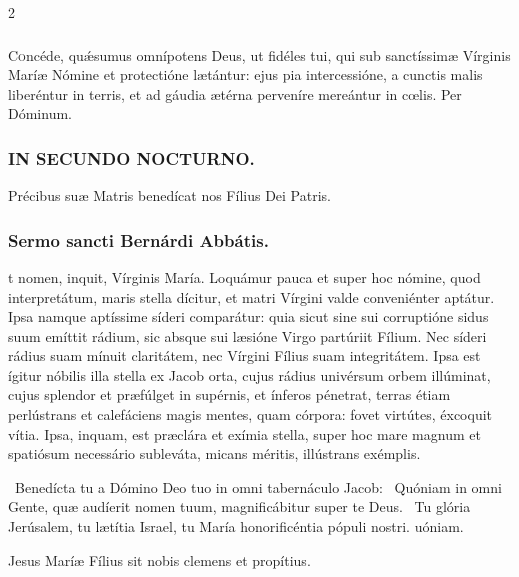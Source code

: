 \documentclass[9pt,twoside]{extarticle}
\begin{document}
\begin{multicols}{2}
\subsubsection*{\center {}}
\lettrine{C}oncéde, quǽsumus omnípotens Deus, ut fidéles tui, qui sub sanctíssimæ Vírginis Maríæ Nómine et protectióne lætántur: ejus pia intercessióne, a cunctis malis liberéntur in terris, et ad gáudia ætérna perveníre mereántur in cœlis. Per Dóminum.

\begin{tightlist}{}
\item {}
\end{tightlist}

\subsubsection*{\center \textsc{IN SECUNDO NOCTURNO.}}
\begin{tightlist}{}
\item {\small {} Précibus suæ Matris benedícat nos Fílius Dei Patris.}
\end{tightlist}
\subsubsection*{\center Sermo sancti Bernárdi Abbátis.}
\begin{center}\end{center}
t nomen, inquit, Vírginis María. Loquámur pauca et super hoc nómine, quod interpretátum, maris stella dícitur, et matri Vírgini valde conveniénter aptátur. Ipsa namque aptíssime síderi comparátur: quia sicut sine sui corruptióne sidus suum emíttit rádium, sic absque sui læsióne Virgo partúriit Fílium. Nec síderi rádius suam mínuit claritátem, nec Vírgini Fílius suam integritátem. Ipsa est ígitur nóbilis illa stella ex Jacob orta, cujus rádius univérsum orbem illúminat, cujus splendor et præfúlget in supérnis, et ínferos pénetrat, terras étiam perlústrans et calefáciens magis mentes, quam córpora: fovet virtútes, éxcoquit vítia. Ipsa, inquam, est præclára et exímia stella, super hoc mare magnum et spatiósum necessário subleváta, micans méritis, illústrans exémplis.

\begin{tightlist}{}
\item {}~Benedícta tu a Dómino Deo tuo in omni tabernáculo Jacob: \textred{*}~Quóniam in omni Gente, quæ audíerit nomen tuum, magnificábitur super te Deus. ~Tu glória Jerúsalem, tu lætítia Israel, tu María honorificéntia pópuli nostri. uóniam.
\item {\small {} Jesus Maríæ Fílius sit nobis clemens et propítius.}
\end{tightlist}


\end{multicols}
\end{document}
